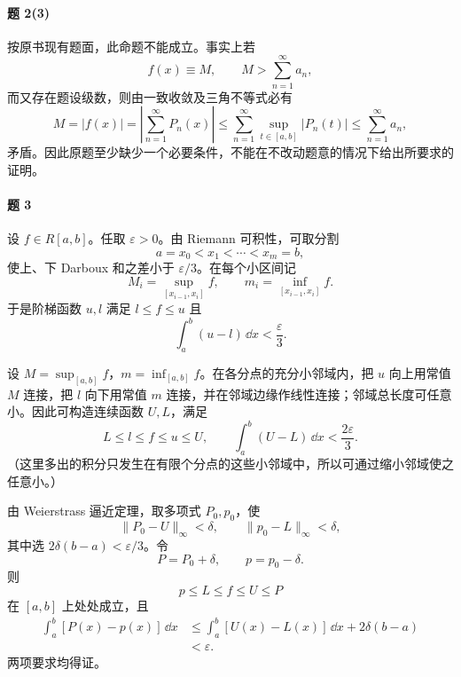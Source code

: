 \paragraph{题 2(3)}
\begin{xsolution}
按原书现有题面，此命题不能成立。事实上若
\[
  f(x)\equiv M,\qquad
  M>\sum_{n=1}^{\infty}a_n,
\]
而又存在题设级数，则由一致收敛及三角不等式必有
\[
  M=|f(x)|
  =\left|\sum_{n=1}^{\infty}P_n(x)\right|
  \leqslant\sum_{n=1}^{\infty}\sup_{t\in[a,b]}|P_n(t)|
  \leqslant\sum_{n=1}^{\infty}a_n,
\]
矛盾。因此原题至少缺少一个必要条件，不能在不改动题意的情况下给出所要求的证明。
\end{xsolution}

\paragraph{题 3}
\begin{xsolution}
设 $f\in R[a,b]$。任取 $\varepsilon>0$。由 Riemann 可积性，可取分割
\[
  a=x_0<x_1<\cdots<x_m=b,
\]
使上、下 Darboux 和之差小于 $\varepsilon/3$。在每个小区间记
\[
  M_i=\sup_{[x_{i-1},x_i]}f,
  \qquad m_i=\inf_{[x_{i-1},x_i]}f.
\]
于是阶梯函数 $u,l$ 满足 $l\leqslant f\leqslant u$ 且
\[
  \int_a^b(u-l)\,\dd x<\frac\varepsilon3.
\]

设 $M=\sup_{[a,b]}f$，$m=\inf_{[a,b]}f$。在各分点的充分小邻域内，把 $u$ 向上用常值 $M$ 连接，把 $l$ 向下用常值 $m$ 连接，并在邻域边缘作线性连接；邻域总长度可任意小。因此可构造连续函数 $U,L$，满足
\[
  L\leqslant l\leqslant f\leqslant u\leqslant U,
  \qquad
  \int_a^b(U-L)\,\dd x<\frac{2\varepsilon}{3}.
\]
（这里多出的积分只发生在有限个分点的这些小邻域中，所以可通过缩小邻域使之任意小。）

由 Weierstrass 逼近定理，取多项式 $P_0,p_0$，使
\[
  \|P_0-U\|_\infty<\delta,
  \qquad \|p_0-L\|_\infty<\delta,
\]
其中选 $2\delta(b-a)<\varepsilon/3$。令
\[
  P=P_0+\delta,\qquad p=p_0-\delta.
\]
则
\[
  p\leqslant L\leqslant f\leqslant U\leqslant P
\]
在 $[a,b]$ 上处处成立，且
\[
\begin{aligned}
  \int_a^b[P(x)-p(x)]\,\dd x
  &\leqslant\int_a^b[U(x)-L(x)]\,\dd x+2\delta(b-a)\\
  &<\varepsilon.
\end{aligned}
\]
两项要求均得证。
\end{xsolution}

